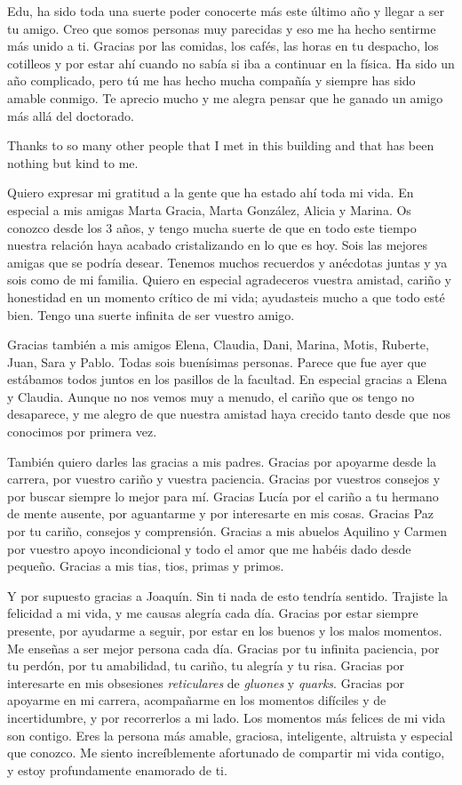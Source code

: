 Edu, ha sido toda una suerte poder conocerte más este último año y llegar a ser tu amigo. Creo que somos personas muy parecidas y eso me ha hecho sentirme más unido a ti. Gracias por las comidas, los cafés, las horas en tu despacho, los cotilleos y por estar ahí cuando no sabía si iba a continuar en la física. Ha sido un año complicado, pero tú me has hecho mucha compañía y siempre has sido amable conmigo. Te aprecio mucho y me alegra pensar que he ganado un amigo más allá del doctorado.

Thanks to so many other people that I met in this building and that has been nothing but kind to me. 

Quiero expresar mi gratitud a la gente que ha estado ahí toda mi vida. En especial a mis amigas Marta Gracia, Marta González, Alicia y Marina. Os conozco desde los 3 años, y tengo mucha suerte de que en todo este tiempo nuestra relación haya acabado cristalizando en lo que es hoy. Sois las mejores amigas que se podría desear. Tenemos muchos recuerdos y anécdotas juntas y ya sois como de mi familia. Quiero en especial agradeceros vuestra amistad, cariño y honestidad en un momento crítico de mi vida; ayudasteis mucho a que todo esté bien. Tengo una suerte infinita de ser vuestro amigo.

Gracias también a mis amigos Elena, Claudia, Dani, Marina, Motis, Ruberte, Juan, Sara y Pablo. Todas sois buenísimas personas. Parece que fue ayer que estábamos todos juntos en los pasillos de la facultad. En especial gracias a Elena y Claudia. Aunque no nos vemos muy a menudo, el cariño que os tengo no desaparece, y me alegro de que nuestra amistad haya crecido tanto desde que nos conocimos por primera vez.

También quiero darles las gracias a mis padres. Gracias por apoyarme desde la carrera, por vuestro cariño y vuestra paciencia. Gracias por vuestros consejos y por buscar siempre lo mejor para mí. Gracias Lucía por el cariño a tu hermano de mente ausente, por aguantarme y por interesarte en mis cosas. Gracias Paz por tu cariño, consejos y comprensión. Gracias a mis abuelos Aquilino y Carmen por vuestro apoyo incondicional y todo el amor que me habéis dado desde pequeño. Gracias a mis tias, tios, primas y primos.

Y por supuesto gracias a Joaquín. Sin ti nada de esto tendría sentido. Trajiste la felicidad a mi vida, y me causas alegría cada día. Gracias por estar siempre presente, por ayudarme a seguir, por estar en los buenos y los malos momentos. Me enseñas a ser mejor persona cada día. Gracias por tu infinita paciencia, por tu perdón, por tu amabilidad, tu cariño, tu alegría y tu risa. Gracias por interesarte en mis obsesiones \textit{reticulares} de \textit{gluones} y \textit{quarks}. Gracias por apoyarme en mi carrera, acompañarme en los momentos difíciles y de incertidumbre, y por recorrerlos a mi lado. Los momentos más felices de mi vida son contigo. Eres la persona más amable, graciosa, inteligente, altruista y especial que conozco. Me siento increíblemente afortunado de compartir mi vida contigo, y estoy profundamente enamorado de ti.

